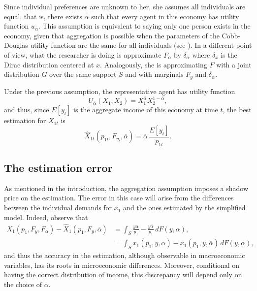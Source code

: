 \documentclass[english, a4paper, 12pt]{article}
\begin{document}
Since individual preferences are unknown to her, she assumes all individuals are equal, that is, there exists $\overline{\alpha}$ such that every agent in this economy has utility function $u_{\overline{\alpha}}$. This assumption is equivalent to saying only one person exists in the economy, given that aggregation is possible when the parameters of the Cobb-Douglas utility function are the same for all individuals (see ). In a different point of view, what the researcher is doing is approximate $F_{\alpha}$ by $\delta_{\overline{\alpha}}$ where $\delta_{x}$ is the Dirac distribution centered at $x$. Analogously, she is approximating $F$ with a joint distribution $G$ over the same support $S$ and with marginals $F_{y}$ and $\delta_{\overline{\alpha}}$. 

Under the previous assumption, the representative agent has utility function
	$$U_{\overline{\alpha}}(X_{1}, X_{2}) = X_{1}^{\overline{\alpha}}X_{2}^{1-\overline{\alpha}},$$
and thus, since $E[y_{t}]$ is the aggregate income of this economy at time $t$, the best estimation for $X_{1t}$ is
	$$\widehat{X}_{1t}(p_{1t}, F_{y_{t}}, \overline{\alpha}) = \overline{\alpha}\, \frac{E[y_{t}]}{p_{1t}}.$$

\subsection{The estimation error} \label{ssec:RepAgError}
As mentioned in the introduction, the aggregation assumption imposes a shadow price on the estimation. The error in this case will arise from the differences between the individual demands for $x_{1}$ and the ones estimated by the simplified model. Indeed, observe that
	\begin{align*}
		X_{1}(p_{1}, F_{y}, F_{\alpha}) - \widehat{X}_{1}(p_{1}, F_{y}, \overline{\alpha})
			&=	\int_{S} \frac{y \alpha}{p_{1}} - \frac{y\overline{\alpha}}{p_{1}} \, dF(y,\alpha),	\\
			&=	\int_{S} x_{1}(p_{1}, y, \alpha) - x_{1}(p_{1}, y, \overline{\alpha}) \, dF(y,\alpha),
	\end{align*}
and thus the accuracy in the estimation, although observable in macroeconomic variables, has its roots in microeconomic differences. Moreover, conditional on having the correct distribution of income, this discrepancy will depend only on the choice of $\overline{\alpha}$. 
\end{document}
